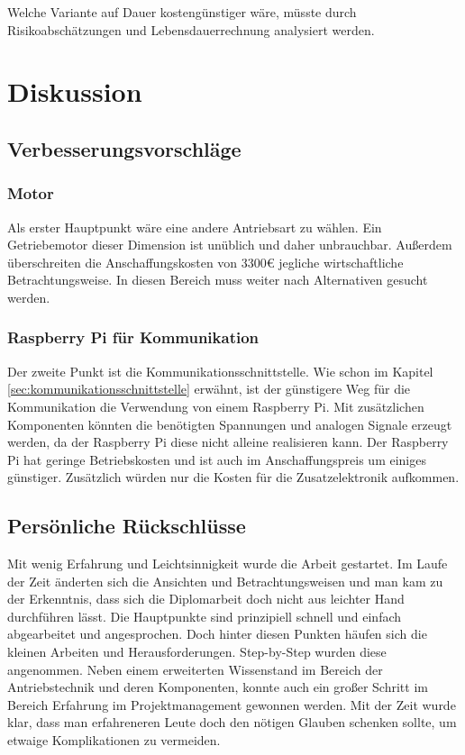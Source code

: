 Welche Variante auf Dauer kostengünstiger wäre, müsste durch Risikoabschätzungen und Lebensdauerrechnung analysiert werden. 


\newpage

\section{Diskussion}
\label{sec:diskussion}

\subsection{Verbesserungsvorschläge}
\label{sec:verbesserungsvorschläge}

\subsubsection{Motor}
\label{sec:verbesserungMotor}

Als erster Hauptpunkt wäre eine andere Antriebsart zu wählen. Ein Getriebemotor dieser Dimension  ist unüblich und daher unbrauchbar. Außerdem überschreiten die Anschaffungskosten von 3300€ jegliche wirtschaftliche Betrachtungsweise. In diesen Bereich muss weiter nach Alternativen gesucht werden. 

\subsubsection{Raspberry Pi für Kommunikation}
\label{sec:raspberryPiKommunikation}

Der zweite Punkt ist die Kommunikationsschnittstelle. Wie schon im Kapitel \ref{sec:kommunikationsschnittstelle} erwähnt, ist der günstigere Weg für die Kommunikation die Verwendung von einem Raspberry Pi. Mit zusätzlichen Komponenten könnten die benötigten Spannungen und analogen Signale erzeugt werden, da der Raspberry Pi diese nicht alleine realisieren kann. Der Raspberry Pi hat geringe Betriebskosten und ist auch im Anschaffungspreis um einiges günstiger. Zusätzlich würden nur die Kosten für die Zusatzelektronik aufkommen. 

\subsection{Persönliche Rückschlüsse}
\label{sec:persönlicheRückschlüsse}

Mit wenig Erfahrung und Leichtsinnigkeit wurde die Arbeit gestartet. Im Laufe der Zeit änderten sich die Ansichten und Betrachtungsweisen und man kam zu der Erkenntnis, dass sich die Diplomarbeit doch nicht aus leichter Hand durchführen lässt. Die Hauptpunkte sind prinzipiell schnell und einfach abgearbeitet und angesprochen. Doch hinter diesen Punkten häufen sich die kleinen Arbeiten und Herausforderungen. Step-by-Step wurden diese angenommen. Neben einem erweiterten Wissenstand im Bereich der Antriebstechnik und deren Komponenten, konnte auch ein großer Schritt im Bereich Erfahrung im Projektmanagement gewonnen werden. Mit der Zeit wurde klar, dass man erfahreneren Leute doch den nötigen Glauben schenken sollte, um etwaige Komplikationen zu vermeiden. 